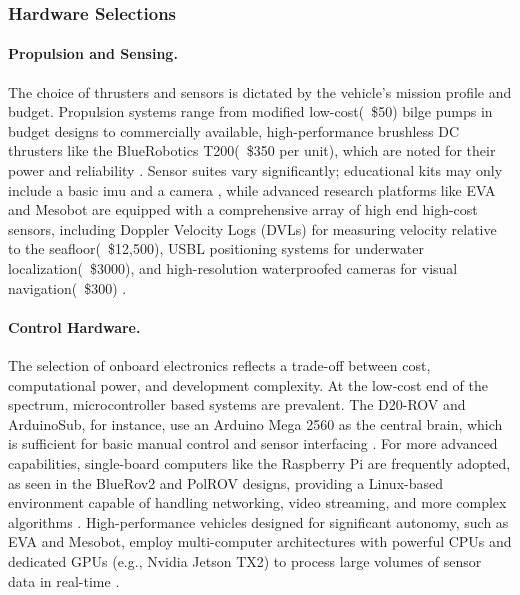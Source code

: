 \documentclass[11pt, a4paper]{article}
\begin{document}
\subsubsection{Hardware Selections}
\paragraph{Propulsion and Sensing.}
The choice of thrusters and sensors is dictated by the vehicle's mission profile and budget. Propulsion systems range from modified low-cost(~\$50) bilge pumps in budget designs \cite{9267948} to commercially available, high-performance brushless DC thrusters like the BlueRobotics T200(~\$350 per unit), which are noted for their power and reliability \cite{8615595, 10200265}. Sensor suites vary significantly; educational kits may only include a basic \gls{imu} and a camera \cite{9659412}, while advanced research platforms like EVA and Mesobot are equipped with a comprehensive array of high end high-cost sensors, including Doppler Velocity Logs (DVLs) for measuring velocity relative to the seafloor(~\$12,500), USBL positioning systems for underwater localization(~\$3000), and high-resolution waterproofed cameras for visual navigation(~\$300) \cite{8558880, 8729822}.

\paragraph{Control Hardware.}
The selection of onboard electronics reflects a trade-off between cost, computational power, and development complexity. At the low-cost end of the spectrum, microcontroller based systems are prevalent. The D20-ROV and ArduinoSub, for instance, use an Arduino Mega 2560 as the central brain, which is sufficient for basic manual control and sensor interfacing \cite{8309454, 5355247}. For more advanced capabilities, single-board computers like the Raspberry Pi are frequently adopted, as seen in the BlueRov2 and PolROV designs, providing a Linux-based environment capable of handling networking, video streaming, and more complex algorithms \cite{10200265, 10928203}. High-performance vehicles designed for significant autonomy, such as EVA and Mesobot, employ multi-computer architectures with powerful CPUs and dedicated GPUs (e.g., Nvidia Jetson TX2) to process large volumes of sensor data in real-time \cite{8558880, 8729822}.
\end{document}
